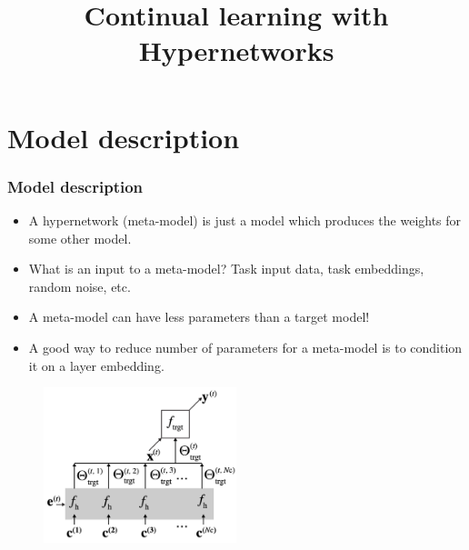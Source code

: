 \documentclass[10pt]{beamer}
\title{Continual learning with Hypernetworks}
\begin{document}

\section{Model description}
\begin{frame}
    \frametitle{Model description}
    
    \begin{itemize}
        \item A hypernetwork (meta-model) is just a model which produces the weights for some other model.
        \item What is an input to a meta-model? Task input data, task embeddings, random noise, etc.
        \item A meta-model can have less parameters than a target model!
        \item A good way to reduce number of parameters for a meta-model is to condition it on a layer embedding.
    \end{itemize}
    
    \begin{figure}
        \centering
        \includegraphics[width=0.5\textwidth]{images/chuncked-hypernetwork.png}
    \end{figure}
\end{frame}
\end{document}
